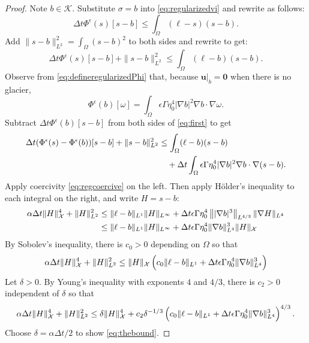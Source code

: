 \documentclass[12pt]{article}
\newcommand{\bu}{\ensuremath{\mathbf{u}}}
\newcommand{\bzero}{\ensuremath{\bm{0}}}
\newcommand{\cK}{\ensuremath{\mathcal{K}}}
\newcommand{\cX}{\ensuremath{\mathcal{X}}}
\newcommand{\grad}{\ensuremath{\nabla}}
\newcommand{\eps}{\ensuremath{\epsilon}}
\begin{document}
\begin{proof}
Note $b\in\cK$.  Substitute $\sigma=b$ into \eqref{eq:regularizedvi} and rewrite as follows:
\begin{equation}
\Delta t \Phi^\eps(s)[s-b] \le \int_\Omega (\ell - s) (s - b).
\end{equation}
Add $\|s-b\|_{L^2}^2=\int_\Omega (s - b)^2$ to both sides and rewrite to get:
\begin{equation}
\Delta t \Phi^\eps(s)[s-b] + \|s-b\|_{L^2}^2 \le \int_\Omega (\ell - b) (s - b). \label{eq:first}
\end{equation}
Observe from \eqref{eq:defineregularizedPhi} that, because $\bu|_b=\bzero$ when there is no glacier,
\begin{equation}
\Phi^\eps(b)[\omega] = \int_\Omega \eps \Gamma \eta_0^4 |\grad b|^2 \grad b \cdot \grad\omega.
\end{equation}
Subtract $\Delta t\Phi^\eps(b)[s-b]$ from both sides of \eqref{eq:first} to get
\begin{align}
\Delta t (\Phi^\eps(s) - \Phi^\eps(b))[s-b] + \|s-b\|_{L^2}^2 &\le \int_\Omega (\ell - b) (s - b) \\
 &\quad + \Delta t \int_\Omega \eps \Gamma \eta_0^4 |\grad b|^2 \grad b \cdot \grad(s-b). \notag
\end{align}
Apply coercivity \eqref{eq:regcoercive} on the left.  Then apply H\"older's inequality to each integral on the right, and write $H=s-b$:
\begin{align}
\alpha \Delta t \|H\|_{\cX}^4 + \|H\|_{L^2}^2 &\le \|\ell - b\|_{L^1} \|H\|_{L^\infty} + \Delta t \eps \Gamma \eta_0^4 \left\||\grad b|^3\right\|_{L^{4/3}} \|\grad H\|_{L^4} \\
 &\le \|\ell - b\|_{L^1} \|H\|_{L^\infty} + \Delta t \eps \Gamma \eta_0^4 \|\grad b\|_{L^4}^3 \|H\|_{\cX} \notag
\end{align}
By Sobolev's inequality, there is $c_0>0$ depending on $\Omega$ so that
\begin{equation}
\alpha \Delta t \|H\|_{\cX}^4 + \|H\|_{L^2}^2 \le \|H\|_{\cX} \left({\large \strut}c_0\|\ell - b\|_{L^1}  + \Delta t \eps \Gamma \eta_0^4 \|\grad b\|_{L^4}^3\right)
\end{equation}
Let $\delta>0$.  By Young's inequality \cite{Evans2010} with exponents $4$ and $4/3$, there is $c_2>0$ independent of $\delta$ so that
\begin{equation}
\alpha \Delta t \|H\|_{\cX}^4 + \|H\|_{L^2}^2 \le \delta \|H\|_{\cX}^4 + c_2 \delta^{-1/3} \left({\large \strut}c_0\|\ell - b\|_{L^1}  + \Delta t \eps \Gamma \eta_0^4 \|\grad b\|_{L^4}^3\right)^{4/3}.
\end{equation}
Choose $\delta = \alpha \Delta t/2$ to show \eqref{eq:thebound}.
\end{proof}
\end{document}
